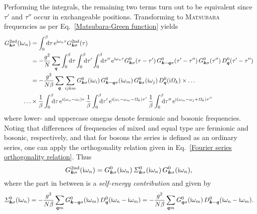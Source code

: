 Performing the integrals, the remaining two terms turn out to be equivalent
since $\tau'$ and $\tau''$ occur in exchangeable positions. Transforming to
\textsc{Matsubara} frequencies as per Eq.~\ref{Matsubara-Green function} yields
%
\begin{align*}
    G \super{2nd}_{\vec k \sigma}(\I \omega_n)
    &= \int \from 0 \till \beta \D \tau \,
    \E^{\I \omega_n \tau} G \super{2nd}_{\vec k \sigma}(\tau) \\
    &= -\frac {g^2} N \sum_{\vec q}
    \int \from 0 \till \beta \D \tau
    \int \from 0 \till \beta \D \tau'
    \int \from 0 \till \beta \D \tau'' \,
    \E^{\I \omega_n \tau}
    G^0_{\vec k \sigma}(\tau - \tau') \,
    G^0_{\vec k - \vec q \sigma}(\tau' - \tau'') \,
    G^0_{\vec k \sigma}(\tau'') \,
    D^0_{\vec q}(\tau' - \tau'') \\
    &= -\frac {g^2}{N \beta} \sum_{\vec q} \sum_{i j k m}
    G^0_{\vec k \sigma}(\I \omega_i) \,
    G^0_{\vec k - \vec q \sigma}(\I \omega_m) \,
    G^0_{\vec k \sigma}(\I \omega_j) \,
    D^0_{\vec q}(\I \Omega_k) \times \dots \\
    \dots &\times
    \frac 1 \beta \int \from 0 \till \beta \D \tau \,
    \E^{\I (\omega_n - \omega_i) \tau} \,
    \frac 1 \beta \int \from 0 \till \beta \D \tau' \,
    \E^{\I (\omega_i - \omega_m - \Omega_k) \tau'} \,
    \frac 1 \beta \int \from 0 \till \beta \D \tau'' \,
    \E^{\I (\omega_m - \omega_j + \Omega_k) \tau''}
\end{align*}
%
where lower- and uppercase omegas denote fermionic and bosonic 
frequencies. Noting that differences of  frequencies of mixed
and equal type are fermionic and bosonic, respectively, and that for bosons the
 series is defined as an ordinary  series,
one can apply the orthogonality relation given in Eq.~\ref{Fourier series
orthogonality relation}. Thus
%
\begin{equation*}
    G \sp{\text{2nd}}_{\boldsymbol k \sigma}(\mathrm i \omega_n) =
    G^0_{\boldsymbol k \sigma}(\mathrm i \omega_n) \,
    \varSigma^0_{\boldsymbol k \sigma}(\mathrm i \omega_n) \,
    G^0_{\boldsymbol k \sigma}(\mathrm i \omega_n),
\end{equation*}
%
where the part in between is a \emph{self-energy contribution} and given by
%
\begin{equation*}
    \varSigma^0_{\boldsymbol k \sigma}(\mathrm i \omega_n)
    = -\frac {g^2}{N \beta} \sum_{\boldsymbol q m}
    G^0_{\boldsymbol k - \boldsymbol q \sigma}(\mathrm i \omega_m) \,
    D^0_{\boldsymbol q}(\mathrm i \omega_n - \mathrm i \omega_m)
    = -\frac {g^2}{N \beta} \sum_{\boldsymbol q m}
    G^0_{\boldsymbol q \sigma}(\mathrm i \omega_m) \,
    D^0_{\boldsymbol k - \boldsymbol q}(\mathrm i \omega_n - \mathrm i \omega_m).
\end{equation*}


